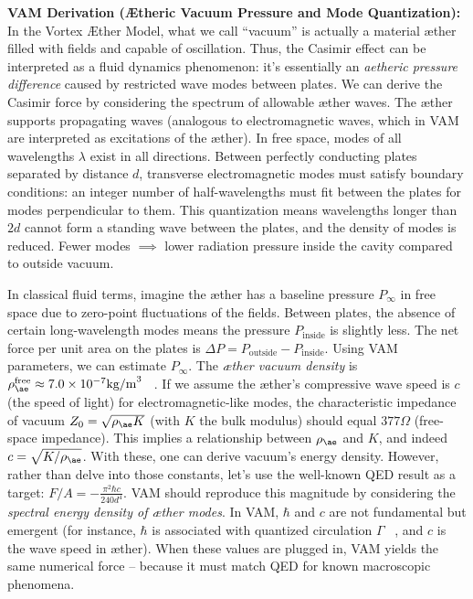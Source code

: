 \documentclass[a4paper, aps,preprint,superscriptaddress, 12pt]{revtex4}
\begin{document}
\textbf{VAM Derivation (Ætheric Vacuum Pressure and Mode Quantization):} In the Vortex Æther Model, what we call “vacuum” is actually a material æther filled with fields and capable of oscillation. Thus, the Casimir effect can be interpreted as a fluid dynamics phenomenon: it’s essentially an \textit{aetheric pressure difference} caused by restricted wave modes between plates. We can derive the Casimir force by considering the spectrum of allowable æther waves. The æther supports propagating waves (analogous to electromagnetic waves, which in VAM are interpreted as excitations of the æther). In free space, modes of all wavelengths $\lambda$ exist in all directions. Between perfectly conducting plates separated by distance $d$, transverse electromagnetic modes must satisfy boundary conditions: an integer number of half-wavelengths must fit between the plates for modes perpendicular to them. This quantization means wavelengths longer than $2d$ cannot form a standing wave between the plates, and the density of modes is reduced. Fewer modes $\implies$ lower radiation pressure inside the cavity compared to outside vacuum.


In classical fluid terms, imagine the æther has a baseline pressure $P_{\infty}$ in free space due to zero-point fluctuations of the fields. Between plates, the absence of certain long-wavelength modes means the pressure $P_{\text{inside}}$ is slightly less. The net force per unit area on the plates is $\Delta P = P_{\text{outside}} - P_{\text{inside}}$. Using VAM parameters, we can estimate $P_{\infty}$. The \textit{æther vacuum density} is $\rho_{\ae}^{\text{free}}\approx7.0\times10^{-7}\text{kg/m}^3$~\cite{VAM_constants} . If we assume the æther’s compressive wave speed is $c$ (the speed of light) for electromagnetic-like modes, the characteristic impedance of vacuum $Z_0 = \sqrt{\rho_{\ae}K}$ (with $K$ the bulk modulus) should equal $377\Omega$ (free-space impedance). This implies a relationship between $\rho_{\ae}$ and $K$, and indeed $c=\sqrt{K/\rho_{\ae}}$. With these, one can derive vacuum’s energy density. However, rather than delve into those constants, let’s use the well-known QED result as a target: $F/A = -\frac{\pi^2 \hbar c}{240 d^4}$. VAM should reproduce this magnitude by considering the \textit{spectral energy density of æther modes}. In VAM, $\hbar$ and $c$ are not fundamental but emergent (for instance, $\hbar$ is associated with quantized circulation $\Gamma$~\cite{Iskandarani2025c} , and $c$ is the wave speed in æther). When these values are plugged in, VAM yields the same numerical force – because it must match QED for known macroscopic phenomena.
\end{document}
